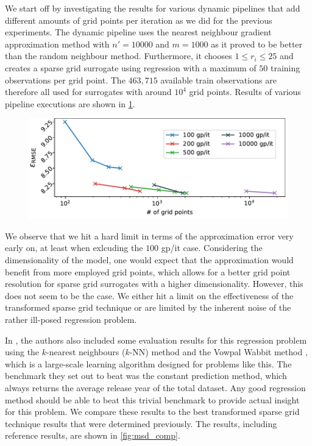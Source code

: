 \documentclass[
  a4paper,  %
  twoside,  %
  bibliography=totoc,
  headsepline,
  cleardoublepage=empty,
  parskip=half,
  draft=false
]{scrbook}
\begin{document}
We start off by investigating the results for various dynamic pipelines that add different amounts of grid points per iteration as we did for the previous experiments.
The dynamic pipeline uses the nearest neighbour gradient approximation method with $n'=10000$ and $m=1000$ as it proved to be better than the random neighbour method.
Furthermore, it chooses $1 \leq r_i \leq 25$ and creates a sparse grid surrogate using regression with a maximum of $50$ training observations per grid point.
The $463,715$ available train observations are therefore all used for surrogates with around $10^4$ grid points.
Results of various pipeline executions are shown in \cref{fig:msd_approx}.

\begin{mdframed}[style=style]
\begin{figure}[H]
\includegraphics[width=\textwidth]{graphics/msd_errors}
\delimit
{}
\label{fig:msd_approx}
\end{figure}
\end{mdframed}
%
We observe that we hit a hard limit in terms of the approximation error very early on, at least when exlcuding the $100$ gp/it case.
Considering the dimensionality of the model, one would expect that the approximation would benefit from more employed grid points, which allows for a better grid point resolution for sparse grid surrogates with a higher dimensionality.
However, this does not seem to be the case.
We either hit a limit on the effectiveness of the transformed sparse grid technique or are limited by the inherent noise of the rather ill-posed regression problem.

In \cite{BertinMahieux2011}, the authors also included some evaluation results for this regression problem using the $k$-nearest neighbours ($k$-NN) method \cite{Altman1992} and the Vowpal Wabbit method \cite{Langford2009}, which is a large-scale learning algorithm designed for problems like this.
The benchmark they set out to beat was the constant prediction method, which always returns the average release year of the total dataset.
Any good regression method should be able to beat this trivial benchmark to provide actual insight for this problem.
We compare these results to the best transformed sparse grid technique results that were determined previously.
The results, including reference results, are shown in \cref{fig:msd_comp}.
\end{document}
